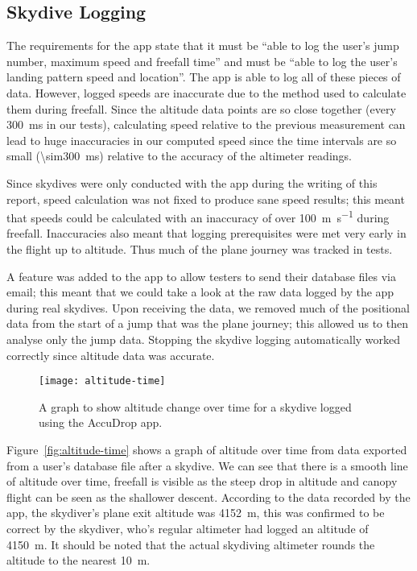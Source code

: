 \subsection{Skydive Logging}\label{subsec:skydive-logging}
The requirements for the app state that it must be ``able to log the user's jump number, maximum speed and freefall time'' and must be ``able to log the user's landing pattern speed and location''. The app is able to log all of these pieces of data. However, logged speeds are inaccurate due to the method used to calculate them during freefall. Since the altitude data points are so close together (every \SI{300}{\milli\second} in our tests), calculating speed relative to the previous measurement can lead to huge inaccuracies in our computed speed since the time intervals are so small (\SI{\sim300}{\milli\second}) relative to the accuracy of the altimeter readings.

Since skydives were only conducted with the app during the writing of this report, speed calculation was not fixed to produce sane speed results; this meant that speeds could be calculated with an inaccuracy of over \SI{100}{\metre\per\second} during freefall. Inaccuracies also meant that logging prerequisites were met very early in the flight up to altitude. Thus much of the plane journey was tracked in tests.

A feature was added to the app to allow testers to send their database files via email; this meant that we could take a look at the raw data logged by the app during real skydives. Upon receiving the data, we removed much of the positional data from the start of a jump that was the plane journey; this allowed us to then analyse only the jump data. Stopping the skydive logging automatically worked correctly since altitude data was accurate.

\begin{figure}[ht]
  \centering
  \texttt{[image: altitude-time]}
  \caption{A graph to show altitude change over time for a skydive logged using the AccuDrop app.}\label{fig:altitude-time}
\end{figure}

Figure~\vref{fig:altitude-time} shows a graph of altitude over time from data exported from a user's database file after a skydive. We can see that there is a smooth line of altitude over time, freefall is visible as the steep drop in altitude and canopy flight can be seen as the shallower descent. According to the data recorded by the app, the skydiver's plane exit altitude was \SI{4152}{\metre}, this was confirmed to be correct by the skydiver, who's regular altimeter had logged an altitude of \SI{4150}{\metre}. It should be noted that the actual skydiving altimeter rounds the altitude to the nearest \SI{10}{\metre}.

